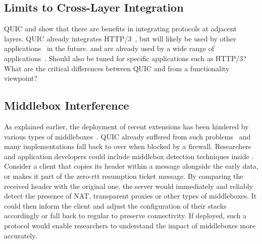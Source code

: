 \subsection{Limits to Cross-Layer Integration}

QUIC and \tcpls show that there are benefits in integrating protocols at
adjacent layers. QUIC already integrates HTTP/3~\cite{draft-ietf-quic-http},
but will likely be used by other
applications~\cite{draft-ietf-dprive-dnsoquic,ssh-quic}
in the future. \tcp and \tls are already used by a wide range of
applications~\cite{anderson2019tls}. Should \tcpls also be tuned
for specific applications such as HTTP/3? What are the critical differences
between QUIC and \tcpls from a functionality viewpoint?









\subsection{Middlebox Interference}

As explained earlier, the deployment of recent \tcp extensions has been
hindered by various types of
middleboxes~\cite{detal2013revealing,medina2004measuring,hesmans2013tcp,edeline2017first}.
QUIC already suffered from such problems~\cite{langley2017quic}
and many implementations fall back to \tls over \tcp when blocked by a firewall.
Researchers and application developers could include middlebox detection
techniques inside \tcpls. Consider a \tcpls client that copies its \syn header
within a \tcpls message alongside the early data, or makes it part of the
zero-rtt resumption ticket message. By comparing the received \tcp header with
the original one, the server would immediately and reliably detect the presence
of NAT, transparent proxies or other types of middleboxes.  It could then inform
the client and adjust the configuration of their stacks accordingly or fall back
to regular \tcp to preserve connectivity. If deployed, such a protocol would
enable researchers to understand the impact of middleboxes more accurately.

